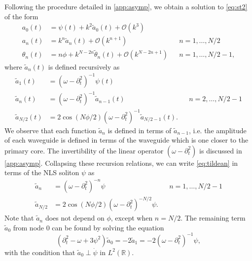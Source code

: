 \documentclass[11pt,reqno]{amsart}
\def\R{{\mathbb R}}
\begin{document}
Following the procedure detailed in \cref{app:asymp}, we obtain a solution to \cref{eq:st2} of the form
\begin{equation}\label{eq:asympsol}
\begin{aligned}
a_0(t) &= \psi(t) + k^2 \widetilde{a}_0(t) + \mathcal{O}(k^3) \\
a_n(t) &= k^n \widetilde{a}_n(t) + \mathcal{O}(k^{n+1}) && n = 1, \dots, N/2 \\
\theta_n(t) &= n \phi + k^{N - 2n} \widetilde{\theta}_n(t) 
+ \mathcal{O}(k^{N - 2n+1}) && n = 1, \dots, N/2-1,
\end{aligned}
\end{equation}
where $\widetilde{a}_n(t)$ is defined recursively as 
\begin{equation}\label{eq:tildean}
\begin{aligned}
\widetilde{a}_1(t) &= (\omega - \partial_t^2)^{-1} \psi(t) \\
\widetilde{a}_n(t) &= (\omega - \partial_t^2)^{-1} \widetilde{a}_{n-1}(t) && n = 2, \dots, N/2-1 \\
\widetilde{a}_{N/2}(t) &= 2 \cos( N\phi/2)(\omega - \partial_t^2)^{-1} \widetilde{a}_{N/2-1}(t).
\end{aligned}
\end{equation}
We observe that each function $\widetilde{a}_n$ is defined in terms of $\widetilde{a}_{n-1}$, i.e. the amplitude of each waveguide is defined in terms of the waveguide which is one closer to the primary core.
The invertibility of the linear operator $(\omega - \partial_t^2)$ is discussed in \cref{app:asymp}. Collapsing these recursion relations, we can write \cref{eq:tildean} in terms of the NLS soliton $\psi$ as
\begin{equation}\label{eq:tildeanpsi}
\begin{aligned}
\widetilde{a}_n &= (\omega - \partial_t^2)^{-n} \psi && n = 1, \dots, N/2-1 \\
\widetilde{a}_{N/2} &= 2 \cos( N\phi/2)(\omega - \partial_t^2)^{-N/2} \psi.
\end{aligned}
\end{equation}
Note that $\widetilde{a}_n$ does not depend on $\phi$, except when $n=N/2$. The remaining term $\widetilde{a}_0$ from node 0 can be found by solving the equation
\begin{equation}\label{eq:tildea0eq}
\left( \partial_t^2 - \omega + 3 \psi^2 \right) \widetilde{a}_0 = -2 \widetilde{a}_1 =
-2 (\omega - \partial_t^2)^{-1} \psi,
\end{equation}
with the condition that $\widetilde{a}_0 \perp \dot \psi$ in $L^2(\R)$.
\end{document}
